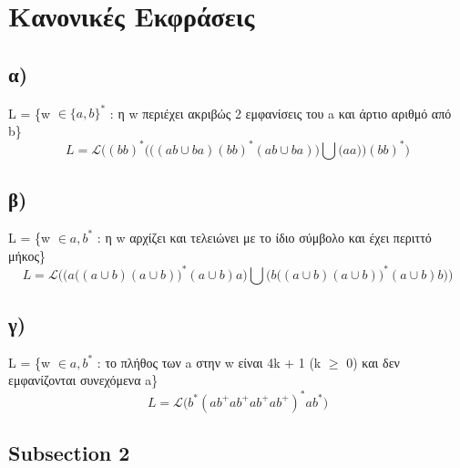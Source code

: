\section{Κανονικές Εκφράσεις}


\subsection[Ερώτημα α]{\textbf{α) }} L = \{w $\in \{a, b\}^*$ : η w περιέχει ακριβώς 2 εμφανίσεις του a και άρτιο αριθμό από b\}
\begin{equation*}
	L = \mathcal{L} \Bigg( (bb)^* \bigg( \Big( (ab \cup ba) (bb)^*(ab \cup ba) \Big)  \bigcup    \Big(aa\Big)  \bigg) (bb)^*\Bigg)
\end{equation*}

\subsection[Ερώτημα β]{\textbf{β) }} L = \{w $\in {a, b}^*$ : η w αρχίζει και τελειώνει με το ίδιο σύμβολο και έχει περιττό μήκος\}
\begin{equation*}
	L = \mathcal{L} \Bigg( \bigg(  a \Big( (a \cup b)(a \cup b) \Big)^* (a \cup b) a \bigg)  \bigcup   \bigg( b \Big( (a \cup b)(a \cup b) \Big)^* (a \cup b) b \bigg) \Bigg)
\end{equation*}

\subsection[Ερώτημα γ]{\textbf{γ) }} L = \{w $\in {a, b}^*$ : το πλήθος των a στην w είναι 4k + 1 (k $\geq$ 0) και δεν εμφανίζονται συνεχόμενα a\}
\begin{equation*}
	L = \mathcal{L} \bigg( b^*(a b^+a b^+a b^+a b^+)^*ab^* \bigg)
\end{equation*}



\subsection*{Subsection 2}
\label{subsection2}

